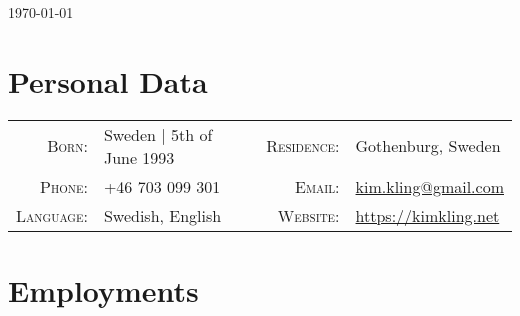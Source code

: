\documentclass[a4paper,10pt]{scrartcl} %
\begin{document}
\pagestyle{empty} %


\hfill {\small \today}
\par{
	\bigskip\par
	
}



\section{Personal Data}
\begin{tabular}{rp{6cm}rl}
	\textsc{Born:}      & Sweden | 5th of June 1993 &
	\textsc{Residence:} & Gothenburg, Sweden \\

	\textsc{Phone:}     & +46 703 099 301 & 
	\textsc{Email:}     & \href{mailto:kim.kling@gmail.com}{kim.kling@gmail.com} \\

	\textsc{Language:}  & Swedish, English & 
	\textsc{Website:}   & \href{https://kimkling.net}{https://kimkling.net}
\end{tabular}



\section{Employments}
\end{document}
